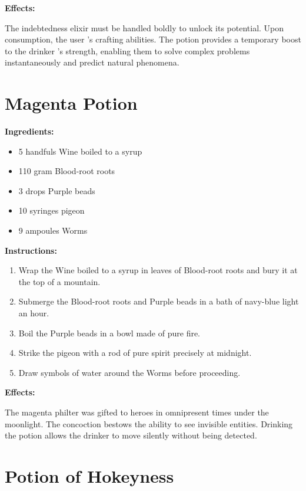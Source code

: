 \documentclass{article}
\begin{document}
\textbf{Effects:}

The indebtedness elixir must be handled boldly to unlock its potential. Upon consumption, the user 's crafting abilities. The potion provides a temporary boost to the drinker 's strength, enabling them to solve complex problems instantaneously and predict natural phenomena.

\newpage
\section*{Magenta Potion}

\textbf{Ingredients:}

\begin{itemize}
  \item 5 handfuls Wine boiled to a syrup
  \item 110 gram Blood-root roots
  \item 3 drops Purple beads
  \item 10 syringes pigeon
  \item 9 ampoules Worms
\end{itemize}

\textbf{Instructions:}

\begin{enumerate}
  \item Wrap the Wine boiled to a syrup in leaves of Blood-root roots and bury it at the top of a mountain.
  \item Submerge the Blood-root roots and Purple beads in a bath of navy-blue light an hour.
  \item Boil the Purple beads in a bowl made of pure fire.
  \item Strike the pigeon with a rod of pure spirit precisely at midnight.
  \item Draw symbols of water around the Worms before proceeding.
\end{enumerate}

\textbf{Effects:}

The magenta philter was gifted to heroes in omnipresent times under the moonlight. The concoction bestows the ability to see invisible entities. Drinking the potion allows the drinker to move silently without being detected.

\newpage
\section*{Potion of Hokeyness}
\end{document}
